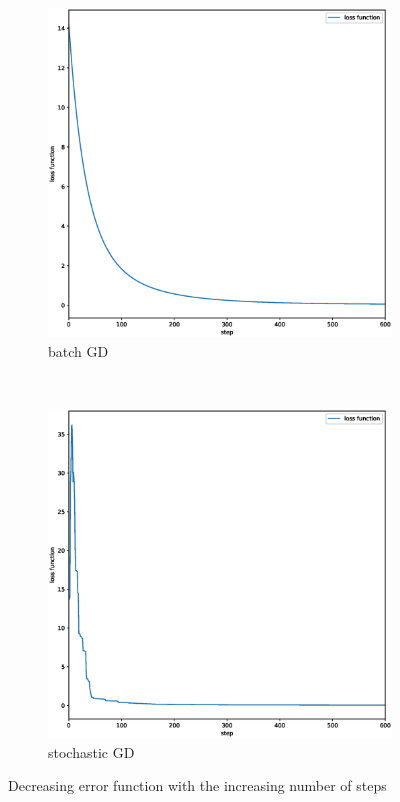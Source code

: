 \documentclass{article}
\begin{document}
\begin{figure}[t!]
    \centering
    \begin{subfigure}[b]{0.45\textwidth}
        \centering
        \includegraphics[width = \linewidth]{bgd.eps}
        \caption{batch GD}
    \end{subfigure}
    ~
    \begin{subfigure}[b]{0.45\textwidth}
        \centering
        \includegraphics[width = \linewidth]{sgd.eps}
        \caption{stochastic GD}
    \end{subfigure}
    \caption{Decreasing error function with the increasing number of steps}
    \label{Error_func}
\end{figure}
\end{document}
